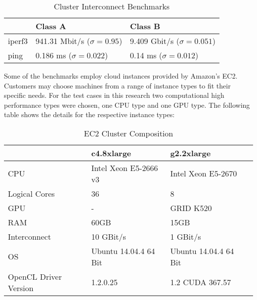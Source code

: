 \begin{table}[!htb]
	\centering
	\begin{adjustbox}{width=0.5\textwidth}
		\small
		\begin{tabular}{l | l | l}
			~                     & Class A                 			& Class B                  \\
			\hline
			iperf3                & 941.31 Mbit/s ($\sigma = 0.95$) 	& 9.409 Gbit/s ($\sigma = 0.051$) \\
			ping                  & 0.186 ms ($\sigma = 0.022$)  		& 0.14 ms ($\sigma = 0.012$)  \\
		\end{tabular}
	\end{adjustbox}
	
	\caption{Cluster Interconnect Benchmarks}
	\label{table:cluster_interconnect_benchmarks}
\end{table}

Some of the benchmarks employ cloud instances provided by Amazon's EC2. Customers may choose machines from a range of instance types to fit their specific needs. For the test cases in this research two computational high performance types were chosen, one CPU type and one GPU type. The following table shows the details for the respective instance types:

\begin{table}[!htb]
	\centering
	\begin{adjustbox}{width=0.65\textwidth}
		\small
		\begin{tabular}{l | l | l | l}
			~                     & c4.8xlarge                	& g2.2xlarge                 \\
			\hline
			CPU                   &  Intel Xeon E5-2666 v3 	& Intel Xeon E5-2670 \\
			Logical Cores         &  36 	& 8 \\
			GPU                   &  -						& GRID K520 \\
			RAM                   &  60GB                       	& 15GB                       \\
			Interconnect          &  10 GBit/s                  	& 1 GBit/s                  \\
			OS                    &  Ubuntu 14.04.4 64 Bit      	& Ubuntu 14.04.4 64 Bit      \\
			OpenCL Driver Version &  1.2.0.25                   & 1.2 CUDA 367.57        \\
		\end{tabular}
	\end{adjustbox}
	
	\caption{EC2 Cluster Composition}
	\label{table:cluster_setup_ec2}
\end{table}

